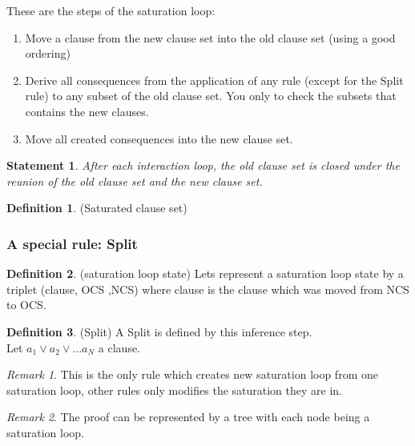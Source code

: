 \documentclass[a4paper, 11pt]{article}
\theoremstyle{plain}
\newtheorem*{stat}{Statement}
\theoremstyle{definition}
\newtheorem*{mydef}{Definition}
\theoremstyle{remark}
\newtheorem*{remark}{Remark}
\begin{document}
These are the steps of the saturation loop:  
\begin{enumerate}  
\item  Move a clause from the new clause set into the old clause set (using a good ordering)
\item  Derive all consequences from the application of any rule (except for the Split rule) to any subset of the old clause set. You only to check the subsets that contains the new clauses.
\item Move all created consequences into the new clause set.
\end{enumerate}


\begin{stat}
After each interaction loop, the old clause set is closed under 
the reunion of the old clause set and the new clause set.
\end{stat} 

\begin{mydef} (Saturated clause set)
\end{mydef}

\subsubsection{A special rule: Split}

\begin{mydef} (saturation loop state)
Lets represent a saturation loop state by a triplet (clause, OCS ,NCS) where clause is the clause which was moved from NCS to OCS. 
\end{mydef} 
 
\begin{mydef} (Split)
A Split is defined by this inference step. 
\\Let $a_1 \vee a_2 \vee \ldots a_N$ a clause.

\begin{prooftree}
\end{prooftree}  
   
\end{mydef}

\begin{remark} This is the only rule which creates new saturation loop from one saturation loop, other rules only modifies the saturation they are in.
\end{remark}
\begin{remark} The proof can be represented by a tree with each node being a saturation loop.
\end{remark}
  
\end{document}
